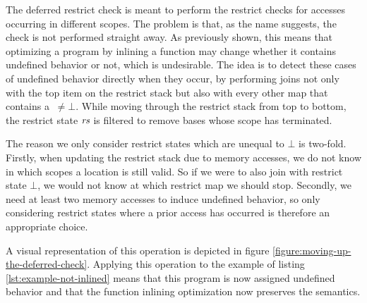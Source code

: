 The deferred restrict check is meant to perform the restrict checks for accesses occurring in different scopes.
The problem is that, as the name suggests, the check is not performed straight away.
As previously shown, this means that optimizing a program by inlining a function may change whether it contains
undefined behavior or not, which is undesirable.
The idea is to detect these cases of undefined behavior directly when they occur, by performing joins not
only with the top item on the restrict stack but also with every other map that contains a \Restrictstate $\ \neq \bot$.
While moving through the restrict stack from top to bottom, the restrict state $\textit{rs}$ is filtered 
to remove bases whose scope has terminated.

The reason we only consider restrict states which are unequal to $\bot$ is two-fold.
Firstly, when updating the restrict stack due to memory accesses, we do not know in which scopes a location
is still valid.
So if we were to also join with restrict state $\bot$, we would not know at which restrict map we should stop.
Secondly, we need at least two memory accesses to induce undefined behavior, so only considering 
restrict states where a prior access has occurred is therefore an appropriate choice. 

A visual representation of this operation is depicted in figure \ref{figure:moving-up-the-deferred-check}.
Applying this operation to the example of listing \ref{lst:example-not-inlined} means that this program is now assigned undefined
behavior and that the function inlining optimization now preserves the semantics.
\\

